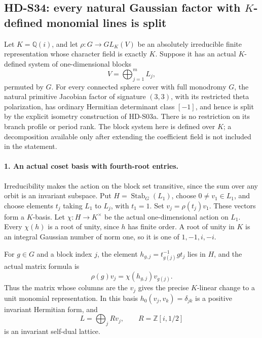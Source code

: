 \subsection{HD-S34: every natural Gaussian factor with \(K\)-defined monomial lines is split}
\label{sec:gaussian-monomial-scope}

Let \(K=\mathbb Q(i)\), and let \(\rho:G\to GL_K(V)\)
be an absolutely irreducible finite representation whose character
field is exactly \(K\). Suppose it has an actual \(K\)-defined
system of one-dimensional blocks
\[
                    V=\bigoplus_{j=1}^m L_j,
\]
permuted by \(G\). For every connected sphere cover with full
monodromy \(G\), the natural primitive Jacobian factor of
signature \((3,3)\), with its restricted theta polarization,
has ordinary Hermitian determinant class \([-1]\), and hence
is split by the explicit isometry construction of HD-S03a.
There is no restriction on its branch profile or period rank.
The block system here is defined over \(K\); a decomposition
available only after extending the coefficient field is not
included in the statement.

\paragraph{1. An actual coset basis with fourth-root entries.}
Irreducibility makes the action on the block set transitive,
since the sum over any orbit is an invariant subspace. Put
\(H=\operatorname{Stab}_G(L_1)\), choose \(0\ne v_1\in L_1\),
and choose elements \(t_j\) taking \(L_1\) to \(L_j\), with
\(t_1=1\). Set \(v_j=\rho(t_j)v_1\). These vectors form a
\(K\)-basis. Let \(\chi:H\to K^\times\) be the actual
one-dimensional action on \(L_1\). Every \(\chi(h)\) is a
root of unity, since \(h\) has finite order. A root of unity in
\(K\) is an integral Gaussian number of norm one, so it is one
of \(1,-1,i,-i\).

For \(g\in G\) and a block index \(j\), the element
\(h_{g,j}=t_{g(j)}^{-1}gt_j\) lies in \(H\), and the actual
matrix formula is
\[
             \rho(g)v_j=\chi(h_{g,j})v_{g(j)}.
 \tag{S34.1}
\]
Thus the matrix whose columns are the \(v_j\) gives the precise
\(K\)-linear change to a unit monomial representation. In this
basis \(h_0(v_j,v_k)=\delta_{jk}\) is a positive invariant
Hermitian form, and
\[
                 L=\bigoplus_j Rv_j,\qquad
                 R=\mathbb Z[i,1/2]
 \tag{S34.2}
\]
is an invariant self-dual lattice.

